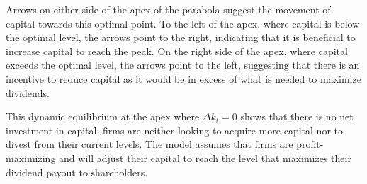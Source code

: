 \documentclass[12pt]{article}
\begin{document}
Arrows on either side of the apex of the parabola suggest the movement of capital towards this optimal point. To the
left of the apex, where capital is below the optimal level, the arrows point to the right, indicating that it is
beneficial to increase capital to reach the peak. On the right side of the apex, where capital exceeds the optimal
level, the arrows point to the left, suggesting that there is an incentive to reduce capital as it would be in excess of
what is needed to maximize dividends. 

This dynamic equilibrium at the apex where \(\Delta k_t = 0\) shows that there is no net investment in capital; firms
are neither looking to acquire more capital nor to divest from their current levels. The model assumes that firms are
profit-maximizing and will adjust their capital to reach the level that maximizes their dividend payout to shareholders. 
\end{document}
